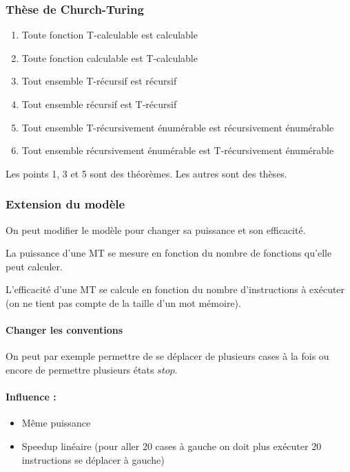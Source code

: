 \subsubsection{Thèse de Church-Turing}
\begin{enumerate}
	\item Toute fonction T-calculable est calculable
	\item Toute fonction calculable est T-calculable
	\item Tout ensemble T-récursif est récursif
	\item Tout ensemble récursif est T-récursif
	\item Tout ensemble T-récursivement énumérable est récursivement 
		énumérable
	\item Tout ensemble récursivement énumérable est T-récursivement 
		énumérable
\end{enumerate}
Les points 1, 3 et 5 sont des théorèmes. Les autres sont des thèses.

\subsubsection{Extension du modèle}
On peut modifier le modèle pour changer sa puissance et son efficacité.

\begin{mydef} La puissance d'une MT se mesure en 
	fonction du nombre de fonctions qu'elle peut calculer.
\end{mydef}


\begin{mydef} L'efficacité d'une MT se calcule en 
	fonction du nombre d'instructions à exécuter (on ne tient pas compte de 
	la taille d'un mot mémoire).
\end{mydef}

\paragraph{Changer les conventions}
On peut par exemple permettre de se déplacer de plusieurs cases à la fois ou 
encore de permettre plusieurs états $stop$.

\paragraph{Influence :} 
\begin{itemize}
	\item Même puissance
	\item Speedup linéaire (pour aller 20 cases à gauche on doit plus 
		exécuter 20 instructions se déplacer à gauche)
\end{itemize}

